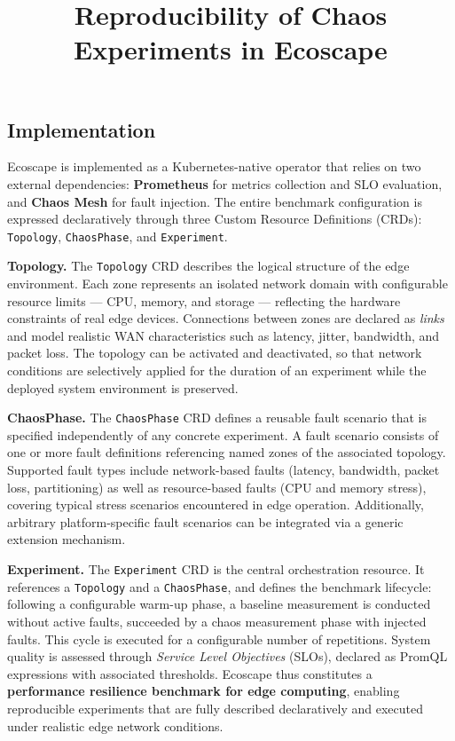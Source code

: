 \documentclass[12pt, a4paper]{article}
\title{Reproducibility of Chaos Experiments in Ecoscape}
\date{}
\begin{document}
\maketitle

\subsection*{Implementation}

Ecoscape is implemented as a Kubernetes-native operator that relies on two external
dependencies: \textbf{Prometheus} for metrics collection and SLO evaluation, and
\textbf{Chaos Mesh} for fault injection. The entire benchmark configuration is expressed
declaratively through three Custom Resource Definitions (CRDs):
\texttt{Topology}, \texttt{ChaosPhase}, and \texttt{Experiment}.

\textbf{Topology.}
The \texttt{Topology} CRD describes the logical structure of the edge environment.
Each zone represents an isolated network domain with configurable resource limits ---
CPU, memory, and storage --- reflecting the hardware constraints of real edge devices.
Connections between zones are declared as \emph{links} and model realistic WAN
characteristics such as latency, jitter, bandwidth, and packet loss.
The topology can be activated and deactivated, so that network conditions are selectively
applied for the duration of an experiment while the deployed system environment is
preserved.

\textbf{ChaosPhase.}
The \texttt{ChaosPhase} CRD defines a reusable fault scenario that is specified
independently of any concrete experiment. A fault scenario consists of one or more
fault definitions referencing named zones of the associated topology. Supported fault
types include network-based faults (latency, bandwidth, packet loss, partitioning) as
well as resource-based faults (CPU and memory stress), covering typical stress scenarios
encountered in edge operation. Additionally, arbitrary platform-specific fault scenarios
can be integrated via a generic extension mechanism.

\textbf{Experiment.}
The \texttt{Experiment} CRD is the central orchestration resource. It references a
\texttt{Topology} and a \texttt{ChaosPhase}, and defines the benchmark lifecycle:
following a configurable warm-up phase, a baseline measurement is conducted without
active faults, succeeded by a chaos measurement phase with injected faults. This cycle
is executed for a configurable number of repetitions. System quality is assessed through
\emph{Service Level Objectives} (SLOs), declared as PromQL expressions with associated
thresholds. Ecoscape thus constitutes a \textbf{performance resilience benchmark for
edge computing}, enabling reproducible experiments that are fully described declaratively
and executed under realistic edge network conditions.
\end{document}
